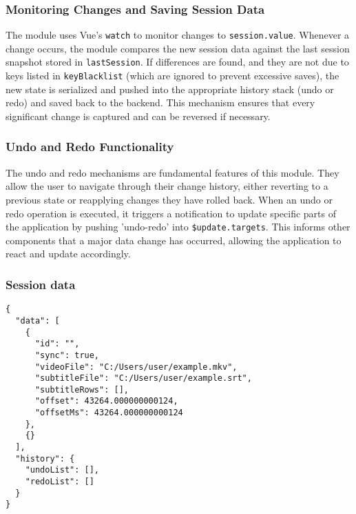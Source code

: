 \subsubsection{Monitoring Changes and Saving Session Data}
The module uses Vue's \texttt{watch} to monitor changes to \texttt{session.value}. Whenever a change occurs, the module compares the new session data against the last session snapshot stored in \texttt{lastSession}. If differences are found, and they are not due to keys listed in \texttt{keyBlacklist} (which are ignored to prevent excessive saves), the new state is serialized and pushed into the appropriate history stack (undo or redo) and saved back to the backend. This mechanism ensures that every significant change is captured and can be reversed if necessary.

\subsubsection{Undo and Redo Functionality}
The undo and redo mechanisms are fundamental features of this module. They allow the user to navigate through their change history, either reverting to a previous state or reapplying changes they have rolled back. When an undo or redo operation is executed, it triggers a notification to update specific parts of the application by pushing 'undo-redo' into \texttt{\$update.targets}. This informs other components that a major data change has occurred, allowing the application to react and update accordingly.

\subsubsection{Session data}

\begin{clisting}
\label{list:sessionjson}
\begin{verbatim}
{
  "data": [
    {
      "id": "",
      "sync": true,
      "videoFile": "C:/Users/user/example.mkv",
      "subtitleFile": "C:/Users/user/example.srt",
      "subtitleRows": [],
      "offset": 43264.000000000124,
      "offsetMs": 43264.000000000124
    },
    {}
  ],
  "history": {
    "undoList": [],
    "redoList": []
  }
}
\end{verbatim}
\end{clisting}

